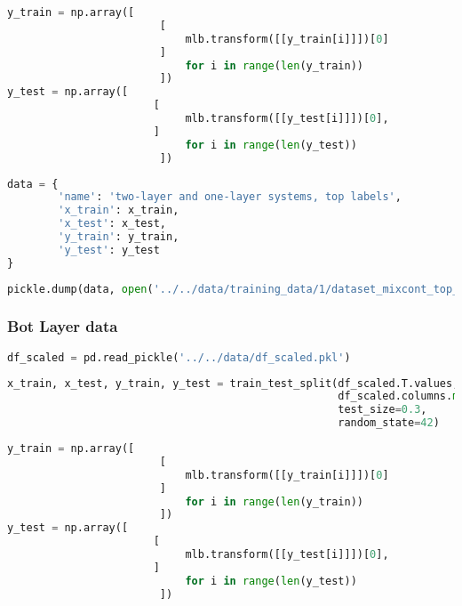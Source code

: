 \begin{lstlisting}[language=Python]
y_train = np.array([    
                        [
                            mlb.transform([[y_train[i]]])[0]
                        ] 
                            for i in range(len(y_train))
                        ])
y_test = np.array([ 
                       [
                            mlb.transform([[y_test[i]]])[0],
                       ] 
                            for i in range(len(y_test))
                        ])
\end{lstlisting}

\begin{lstlisting}[language=Python]
data = {
        'name': 'two-layer and one-layer systems, top labels',
        'x_train': x_train,
        'x_test': x_test,
        'y_train': y_train,
        'y_test': y_test
}
\end{lstlisting}

\begin{lstlisting}[language=Python]
pickle.dump(data, open('../../data/training_data/1/dataset_mixcont_top_layer.pkl', 'wb'))
\end{lstlisting}

\hypertarget{bot-layer-data}{%
\subsubsection*{Bot Layer data}\label{bot-layer-data}}

\begin{lstlisting}[language=Python]
df_scaled = pd.read_pickle('../../data/df_scaled.pkl')
\end{lstlisting}

\begin{lstlisting}[language=Python]
x_train, x_test, y_train, y_test = train_test_split(df_scaled.T.values,
                                                    df_scaled.columns.map(lambda x: x.split('_')[1]), # second part of the filename is the bot label
                                                    test_size=0.3,
                                                    random_state=42)
\end{lstlisting}

\begin{lstlisting}[language=Python]
y_train = np.array([    
                        [
                            mlb.transform([[y_train[i]]])[0]
                        ] 
                            for i in range(len(y_train))
                        ])
y_test = np.array([ 
                       [
                            mlb.transform([[y_test[i]]])[0],
                       ] 
                            for i in range(len(y_test))
                        ])
\end{lstlisting}

